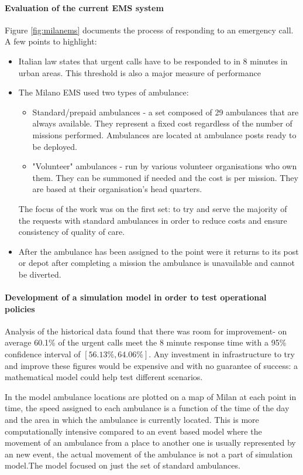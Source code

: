 \documentclass[11pt]{article} %
\begin{document}
\paragraph{Evaluation of the current EMS system }
	Figure \ref{fig:milanems} documents  the process of responding to an emergency call. A few points to highlight: 
	\begin{itemize}
		\item Italian law states that urgent calls have to be responded to in 8 minutes in urban areas. This threshold is also a major measure of performance 
		\item The Milano EMS used two types of ambulance: 
		\begin{itemize}
			\item Standard/prepaid ambulances - a set composed of 29 ambulances that are always available. They represent a fixed cost regardless of the number of missions performed. Ambulances are located at ambulance posts ready to be deployed.
			\item "Volunteer" ambulances - run by various volunteer organisations who own them. They can be summoned if needed and the cost is per mission. They are based at their organisation's head quarters.
		\end{itemize}
		The focus of the work was on the first set: to try and serve the majority of the requests with standard ambulances in order to reduce costs and ensure consistency of quality of care. 
		\item After the ambulance has been assigned to the point were it returns to its post or depot after completing a mission the ambulance is unavailable and cannot be diverted. 
	\end{itemize}
\paragraph{Development of a simulation model in order to test operational policies }
Analysis of the historical data found that there was room for improvement- on average 60.1\% of the urgent calls meet the 8 minute response time with a 95\% confidence interval of $ [56.13\%, 64.06\%] $. Any investment in infrastructure to try and improve these figures would be expensive and with no guarantee of success: a mathematical model could help test different scenarios. 

In the model ambulance locations are plotted on a map of Milan at each point in time, the speed assigned to each ambulance is a function of the time of the day and the area in which the ambulance is currently located. This is more  computationally intensive compared to an event based model where the movement of an ambulance from a place to another one is usually represented by an new event, the actual movement of the ambulance is not a part of simulation model.The model focused on just the set of standard ambulances.
\end{document}
